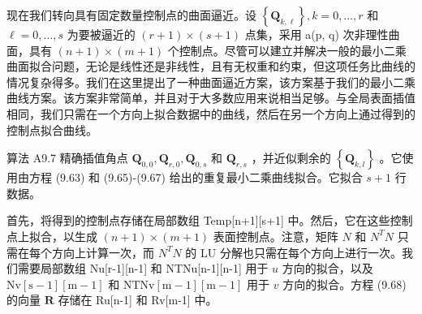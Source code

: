\documentclass[../main.tex]{subfiles}
\begin{document}
现在我们转向具有固定数量控制点的曲面逼近。设 \(\left\{  {\mathbf{Q}}_{k,\ell }\right\}  ,k = 0,\ldots ,r\) 和 \(\ell  = 0,\ldots ,s\) 为要被逼近的 \(\left( {r + 1}\right)  \times  \left( {s + 1}\right)\) 点集，采用 a(p, q) 次非理性曲面，具有 \(\left( {n + 1}\right)  \times  \left( {m + 1}\right)\) 个控制点。尽管可以建立并解决一般的最小二乘曲面拟合问题，无论是线性还是非线性，且有无权重和约束，但这项任务比曲线的情况复杂得多。我们在这里提出了一种曲面逼近方案，该方案基于我们的最小二乘曲线方案。该方案非常简单，并且对于大多数应用来说相当足够。与全局表面插值相同，我们只需在一个方向上拟合数据中的曲线，然后在另一个方向上通过得到的控制点拟合曲线。





算法 A9.7 精确插值角点 \({\mathbf{Q}}_{0,0},{\mathbf{Q}}_{r,0},{\mathbf{Q}}_{0,s}\) 和 \({\mathbf{Q}}_{r,s}\) ，并近似剩余的 \(\left\{  {\mathbf{Q}}_{k,l}\right\}\) 。它使用由方程 (9.63) 和 (9.65)-(9.67) 给出的重复最小二乘曲线拟合。它拟合 \(s + 1\) 行数据。





首先，将得到的控制点存储在局部数组 Temp[n+1][s+1] 中。然后，它在这些控制点上拟合，以生成 \(\left( {n + 1}\right)  \times  \left( {m + 1}\right)\) 表面控制点。注意，矩阵 \(N\) 和 \({N}^{T}N\) 只需在每个方向上计算一次，而 \({N}^{T}N\) 的 LU 分解也只需在每个方向上进行一次。我们需要局部数组 Nu[r-1][n-1] 和 NTNu[n-1][n-1] 用于 \(u\) 方向的拟合，以及 \(\mathrm{{Nv}}\left\lbrack  {\mathrm{s} - 1}\right\rbrack  \left\lbrack  {\mathrm{m} - 1}\right\rbrack\) 和 \(\mathrm{{NTNv}}\left\lbrack  {\mathrm{m} - 1}\right\rbrack  \left\lbrack  {\mathrm{m} - 1}\right\rbrack\) 用于 \(v\) 方向的拟合。方程 (9.68) 的向量 \(\mathbf{R}\) 存储在 Ru[n-1] 和 Rv[m-1] 中。
\end{document}
